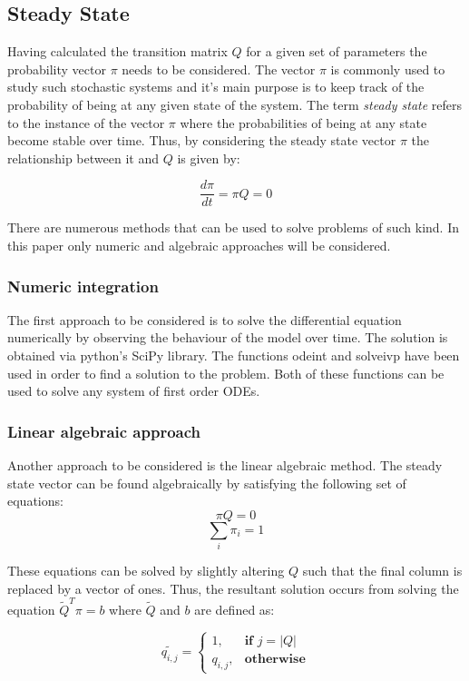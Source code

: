 \subsection{Steady State}
Having calculated the transition matrix \( Q \) for a given set of parameters the probability vector \( \pi \) needs to be considered. The vector \( \pi \) is commonly used to study such stochastic systems and it's main purpose is to keep track of the probability of being at any given state of the system. The term \textit{steady state} refers to the instance of the vector \( \pi \) where the probabilities of being at any state become stable over time. Thus, by considering the steady state vector \( \pi \) the relationship between it and \(Q \) is given by:

\[
\frac{d\pi}{dt} = \pi Q = 0
\]

There are numerous methods that can be used to solve problems of such kind. In this paper only numeric and algebraic approaches will be considered. 

\subsubsection{Numeric integration}
The first approach to be considered is to solve the differential equation numerically by observing the behaviour of the model over time. The solution is obtained via python's SciPy library. The functions odeint and solve\textunderscore ivp have been used in order to find a solution to the problem. Both of these functions can be used to solve any system of first order ODEs.

\subsubsection{Linear algebraic approach}
Another approach to be considered is the linear algebraic method. The steady state vector can be found algebraically by satisfying the following set of equations:
\[ \pi Q = 0 \]
\[ \sum_{i} \pi_i = 1 \]

These equations can be solved by slightly altering \( Q \) such that the final column is replaced by a vector of ones. Thus, the resultant solution occurs from solving the equation \( \tilde{Q}^T \pi = b \) where \( \tilde{Q} \) and \( b \) are defined as:

\[
\tilde{q_{i, j}} = 
\begin{cases}
    1, & \textbf{if } j = |Q| \\
    q_{i,j}, & \textbf{otherwise}
\end{cases}
\]

